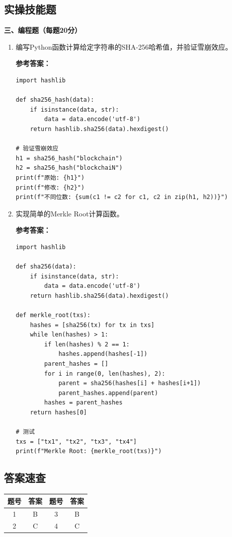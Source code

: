 ﻿\documentclass[12pt,a4paper]{article}
\begin{document}
\subsection{实操技能题}

\textbf{三、编程题（每题20分）}

\begin{enumerate}[leftmargin=1.5em]
\item 编写Python函数计算给定字符串的SHA-256哈希值，并验证雪崩效应。

\textbf{参考答案：}
\begin{lstlisting}
import hashlib

def sha256_hash(data):
    if isinstance(data, str):
        data = data.encode('utf-8')
    return hashlib.sha256(data).hexdigest()

# 验证雪崩效应
h1 = sha256_hash("blockchain")
h2 = sha256_hash("blockchaiN")
print(f"原始: {h1}")
print(f"修改: {h2}")
print(f"不同位数: {sum(c1 != c2 for c1, c2 in zip(h1, h2))}")
\end{lstlisting}

\item 实现简单的Merkle Root计算函数。

\textbf{参考答案：}
\begin{lstlisting}
import hashlib

def sha256(data):
    if isinstance(data, str):
        data = data.encode('utf-8')
    return hashlib.sha256(data).hexdigest()

def merkle_root(txs):
    hashes = [sha256(tx) for tx in txs]
    while len(hashes) > 1:
        if len(hashes) % 2 == 1:
            hashes.append(hashes[-1])
        parent_hashes = []
        for i in range(0, len(hashes), 2):
            parent = sha256(hashes[i] + hashes[i+1])
            parent_hashes.append(parent)
        hashes = parent_hashes
    return hashes[0]

# 测试
txs = ["tx1", "tx2", "tx3", "tx4"]
print(f"Merkle Root: {merkle_root(txs)}")
\end{lstlisting}
\end{enumerate}

\subsection{答案速查}

\begin{center}
\begin{tabular}{|c|c|c|c|}
\hline
\textbf{题号} & \textbf{答案} & \textbf{题号} & \textbf{答案} \\
\hline
1 & B & 3 & B \\
2 & C & 4 & C \\
\hline
\end{tabular}
\end{center}
\end{document}
